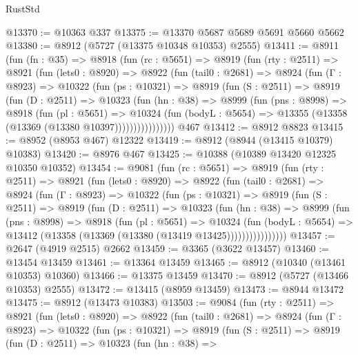 \begin{lexlean}{RustStd}
\begin{coremodule}
@13370 := @10363 @337
@13375 := @13370 @5687 @5689 @5691 @5660 @5662
@13380 := @8912 (@5727 (@13375 @10348 @10353) @2555)
@13411 := @8911
    (fun (fn : @35) =>
    @8918
      (fun (rc : @5651) =>
      @8919
        (fun (rty : @2511) =>
        @8921
          (fun (lets0 : @8920) =>
          @8922
            (fun (tail0 : @2681) =>
            @8924
              (fun (Γ : @8923) =>
              @10322
                (fun (ps : @10321) =>
                @8919
                  (fun (S : @2511) =>
                  @8919
                    (fun (D : @2511) =>
                    @10323
                      (fun (hn : @38) =>
                      @8999
                        (fun (pns : @8998) =>
                        @8918
                          (fun (pl : @5651) =>
                          @10324
                            (fun (bodyL : @5654) =>
                            @13355 (@13358 (@13369 (@13380 @10397))))))))))))))))
    @467
@13412 := @8912 @8823
@13415 := @8952 (@8953 @467) @12322
@13419 := @8912 (@8944 (@13415 @10379) @10383)
@13420 := @8976 @467
@13425 := @10388 (@10389 @13420 @12325 @10350 @10352)
@13454 := @9081
    (fun (rc : @5651) =>
    @8919
      (fun (rty : @2511) =>
      @8921
        (fun (lets0 : @8920) =>
        @8922
          (fun (tail0 : @2681) =>
          @8924
            (fun (Γ : @8923) =>
            @10322
              (fun (ps : @10321) =>
              @8919
                (fun (S : @2511) =>
                @8919
                  (fun (D : @2511) =>
                  @10323
                    (fun (hn : @38) =>
                    @8999
                      (fun (pns : @8998) =>
                      @8918
                        (fun (pl : @5651) =>
                        @10324
                          (fun (bodyL : @5654) =>
                          @13412 (@13358 (@13369 (@13380 (@13419 @13425))))))))))))))))
@13457 := @2647 (@4919 @2515) @2662
@13459 := @3365 (@3622 @13457)
@13460 := @13454 @13459
@13461 := @13364 @13459
@13465 := @8912 (@10340 (@13461 @10353) @10360)
@13466 := @13375 @13459
@13470 := @8912 (@5727 (@13466 @10353) @2555)
@13472 := @13415 (@8959 @13459)
@13473 := @8944 @13472
@13475 := @8912 (@13473 @10383)
@13503 := @9084
    (fun (rty : @2511) =>
    @8921
      (fun (lets0 : @8920) =>
      @8922
        (fun (tail0 : @2681) =>
        @8924
          (fun (Γ : @8923) =>
          @10322
            (fun (ps : @10321) =>
            @8919
              (fun (S : @2511) =>
              @8919
                (fun (D : @2511) =>
                @10323
                  (fun (hn : @38) =>

\end{coremodule}
\end{lexlean}

